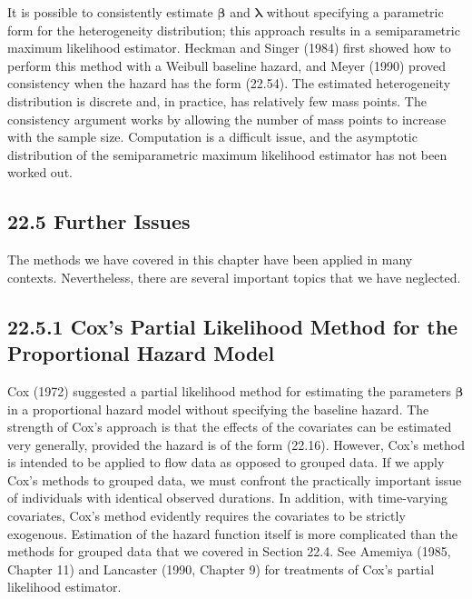 \documentclass[10pt]{article}
\begin{document}
It is possible to consistently estimate $\boldsymbol{\beta}$ and $\boldsymbol{\lambda}$ without specifying a parametric form for the heterogeneity distribution; this approach results in a semiparametric maximum likelihood estimator. Heckman and Singer (1984) first showed how to perform this method with a Weibull baseline hazard, and Meyer (1990) proved consistency when the hazard has the form (22.54). The estimated heterogeneity distribution is discrete and, in practice, has relatively few mass points. The consistency argument works by allowing the number of mass points to increase with the sample size. Computation is a difficult issue, and the asymptotic distribution of the semiparametric maximum likelihood estimator has not been worked out.

\subsection*{22.5 Further Issues}
The methods we have covered in this chapter have been applied in many contexts. Nevertheless, there are several important topics that we have neglected.

\subsection*{22.5.1 Cox's Partial Likelihood Method for the Proportional Hazard Model}
Cox (1972) suggested a partial likelihood method for estimating the parameters $\boldsymbol{\beta}$ in a proportional hazard model without specifying the baseline hazard. The strength of Cox's approach is that the effects of the covariates can be estimated very generally, provided the hazard is of the form (22.16). However, Cox's method is intended to be applied to flow data as opposed to grouped data. If we apply Cox's methods to grouped data, we must confront the practically important issue of individuals with identical observed durations. In addition, with time-varying covariates, Cox's method evidently requires the covariates to be strictly exogenous. Estimation of the hazard function itself is more complicated than the methods for grouped data that we covered in Section 22.4. See Amemiya (1985, Chapter 11) and Lancaster (1990, Chapter 9) for treatments of Cox's partial likelihood estimator.
\end{document}
